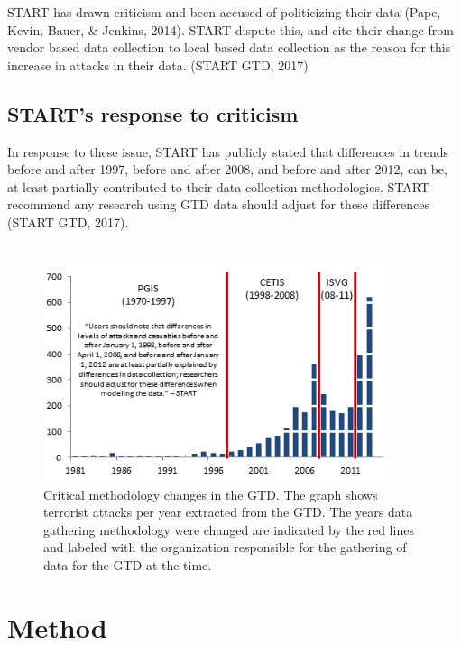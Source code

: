 \documentclass[10pt,a4paper]{article}
\begin{document}
START has drawn criticism and been accused of politicizing their data (Pape, Kevin, Bauer, \& Jenkins, 2014). START dispute this, and cite their change from vendor based data collection to local based data collection as the reason for this increase in attacks in their data. (START GTD, 2017)

\subsection{START’s response to criticism }

In response to these issue, START has publicly stated that differences in trends before and after 1997, before and after 2008, and before and after 2012, can be, at least partially contributed to their data collection methodologies. START recommend any research using GTD data should adjust for these differences (START GTD, 2017).
\\\\
\begin{center}
\begin{figure}[h!]
\includegraphics[width=0.9\textwidth]{backgroundpic2.png}
\caption{Critical methodology changes in the GTD. 
The graph shows terrorist attacks per year extracted from the GTD. The years data gathering methodology were changed are indicated by the red lines and labeled with  the organization responsible for the gathering of data for the GTD at the time.
}
\end{figure}
\end{center}

\newpage



\section{Method}
\end{document}
